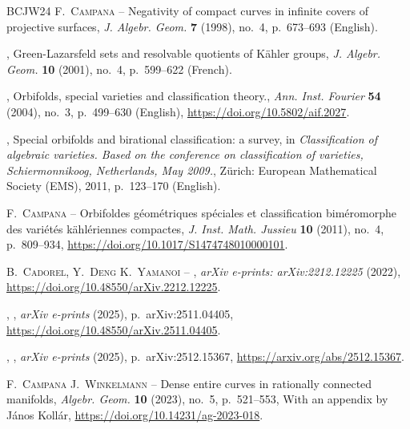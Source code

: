 \documentclass[11pt,english]{smfart}
\theoremstyle{plain}
\theoremstyle{definition}
\theoremstyle{remark}
\numberwithin{equation}{subsection}
\theoremstyle{plain}
\begin{document}
\begin{thebibliography}{BCJW24}
 	{\scshape F.~Campana} -- {\og Negativity of compact curves in infinite covers
 		of projective surfaces\fg}, \emph{J. Algebr. Geom.} \textbf{7} (1998), no.~4,
 	p.~673--693 (English).
 	
 	\bysame , {\og Green-{Lazarsfeld} sets and resolvable quotients of {K{\"a}hler}
 		groups\fg}, \emph{J. Algebr. Geom.} \textbf{10} (2001), no.~4, p.~599--622
 	(French).
 	
 	\bysame , {\og Orbifolds, special varieties and classification theory.\fg},
 	\emph{Ann. Inst. Fourier} \textbf{54} (2004), no.~3, p.~499--630 (English),
 	\url{https://doi.org/10.5802/aif.2027}.
 	
 	\bysame , {\og Special orbifolds and birational classification: a survey\fg},
 	in \emph{Classification of algebraic varieties. Based on the conference on
 		classification of varieties, Schiermonnikoog, Netherlands, May 2009.},
 	Z{\"u}rich: European Mathematical Society (EMS), 2011, p.~123--170 (English).
 	
 	{\scshape F.~Campana} -- {\og Orbifoldes g\'{e}om\'{e}triques sp\'{e}ciales et
 		classification bim\'{e}romorphe des vari\'{e}t\'{e}s k\"{a}hl\'{e}riennes
 		compactes\fg}, \emph{J. Inst. Math. Jussieu} \textbf{10} (2011), no.~4,
 	p.~809--934, \url{https://doi.org/10.1017/S1474748010000101}.
 	
 	{\scshape B.~{Cadorel}, Y.~{Deng} {\normalfont \smfandname} K.~{Yamanoi}} --
 	{\fg}, \emph{arXiv e-prints: arXiv:2212.12225} (2022),
 	\url{https://doi.org/10.48550/arXiv.2212.12225}.
 	
 	\bysame , {\fg}, \emph{arXiv e-prints} (2025), p.~arXiv:2511.04405,
 	\url{https://doi.org/10.48550/arXiv.2511.04405}.
 	
 	\bysame , {\fg},
 	\emph{arXiv e-prints} (2025), p.~arXiv:2512.15367,
 	\url{https://arxiv.org/abs/2512.15367}.
 	
 	{\scshape F.~Campana {\normalfont \smfandname} J.~Winkelmann} -- {\og Dense
 		entire curves in rationally connected manifolds\fg}, \emph{Algebr. Geom.}
 	\textbf{10} (2023), no.~5, p.~521--553, With an appendix by J\'anos Koll\'ar,
 	\url{https://doi.org/10.14231/ag-2023-018}.
 	

\end{thebibliography}
\end{document}
